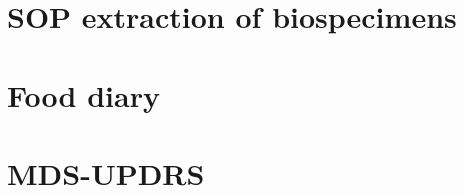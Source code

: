 \section{SOP extraction of biospecimens}
\setcounter{page}{1}

\setcounter{page}{1}


\section{Food diary}
\label{sec:food_diary}
  

\section{MDS-UPDRS}
\label{sec:mds_updrs}
  
